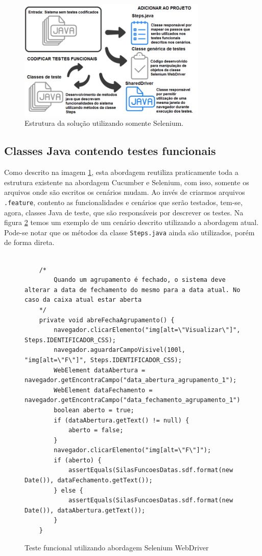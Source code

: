 \documentclass[tg]{mdtufsm}
\begin{document}
\begin{figure}[!htb]
	\centering
	\includegraphics[width=0.8\textwidth]{solucao3}
	\caption{Estrutura da solução utilizando somente Selenium.}
	\label{fig:solucao3}
\end{figure}

\subsection{Classes Java contendo testes funcionais}
Como descrito na imagem \ref{fig:solucao3}, esta abordagem reutiliza praticamente toda a estrutura existente na abordagem Cucumber e Selenium, com isso, somente os arquivos onde são escritos os cenários mudam. Ao invés de criarmos arquivos \texttt{.feature}, contento as funcionalidades e cenários que serão testados, tem-se, agora, classes Java de teste, que são responsáveis por descrever os testes.
Na figura \ref{code:seleniumTeste} temos um exemplo de um cenário descrito utilizando a abordagem atual.  Pode-se notar que os métodos da classe \texttt{Steps.java} ainda são utilizados, porém de forma direta.

\begin{figure}[!htt]
	\begin{lstlisting}
	
	/*
		Quando um agrupamento é fechado, o sistema deve alterar a data de fechamento do mesmo para a data atual. No caso da caixa atual estar aberta
	*/
	private void abreFechaAgrupamento() {
		navegador.clicarElemento("img[alt=\"Visualizar\"]", Steps.IDENTIFICADOR_CSS);
		navegador.aguardarCampoVisivel(100l, "img[alt=\"F\"]", Steps.IDENTIFICADOR_CSS);
		WebElement dataAbertura = navegador.getEncontraCampo("data_abertura_agrupamento_1");
		WebElement dataFechamento = navegador.getEncontraCampo("data_fechamento_agrupamento_1");
		boolean aberto = true;
		if (dataAbertura.getText() != null) {
			aberto = false;
		}
		navegador.clicarElemento("img[alt=\"F\"]");
		if (aberto) {
			assertEquals(SilasFuncoesDatas.sdf.format(new Date()), dataFechamento.getText());
		} else {
			assertEquals(SilasFuncoesDatas.sdf.format(new Date()), dataAbertura.getText());
		}
	}	
	\end{lstlisting}
	\caption{Teste funcional utilizando abordagem Selenium WebDriver}
	\label{code:seleniumTeste}
\end{figure}
\end{document}
